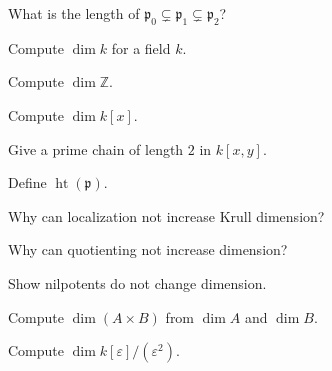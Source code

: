\begin{exercise}\label{exer:vi29-01}
What is the length of $\mathfrak p_0\subsetneq\mathfrak p_1\subsetneq\mathfrak p_2$?
\end{exercise}

\begin{exercise}[VI.29.E2: Field]\label{exer:vi29-02}
Compute $\dim k$ for a field $k$.
\end{exercise}

\begin{exercise}[VI.29.E3: Integers]\label{exer:vi29-03}
Compute $\dim\mathbb Z$.
\end{exercise}

\begin{exercise}\label{exer:vi29-04}
Compute $\dim k[x]$.
\end{exercise}

\begin{exercise}\label{exer:vi29-05}
Give a prime chain of length $2$ in $k[x,y]$.
\end{exercise}

\begin{exercise}[VI.29.E6: Height]\label{exer:vi29-06}
Define $\operatorname{ht}(\mathfrak p)$.
\end{exercise}

\begin{exercise}[VI.29.E7: Localization]\label{exer:vi29-07}
Why can localization not increase Krull dimension?
\end{exercise}

\begin{exercise}[VI.29.E8: Quotient]\label{exer:vi29-08}
Why can quotienting not increase dimension?
\end{exercise}

\begin{exercise}[VI.29.E9: Reduction]\label{exer:vi29-09}
Show nilpotents do not change dimension.
\end{exercise}

\begin{exercise}[VI.29.E10: Product]\label{exer:vi29-10}
Compute $\dim(A\times B)$ from $\dim A$ and $\dim B$.
\end{exercise}

\begin{exercise}\label{exer:vi29-11}
Compute $\dim k[\varepsilon]/(\varepsilon^2)$.
\end{exercise}

